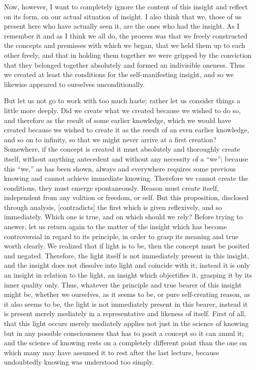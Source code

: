 Now, however, I want to completely ignore the content of
this insight and reflect on its form, on our actual situation of insight.
I also think that we, those of us present here who have actually seen it,
are the ones who had the insight.
As I remember it and as I think we all do, the
process was that we freely constructed the concepts and premisses with
which we began, that we held them up to each other freely, and that in
holding them together we were gripped by the conviction that they
belonged together absolutely and formed an indivisible oneness.
Thus we created at least the conditions for the self-manifesting insight,
and so we likewise appeared to ourselves unconditionally.

But let us not go to work with too much haste;
rather let us consider things a little more deeply.
Did we create what we created because we wished to do so, and
therefore as the result of some earlier knowledge,
which we would have created because we wished to create it
as the result of an even earlier knowledge, and so on to infinity,
so that we might never arrive at a first creation?
Somewhere, if the concept is created it must absolutely and thoroughly
create itself, without anything antecedent and
without any necessity of a “we”;
because this “we,” as has been shown,
always and everywhere requires some previous knowing and
cannot achieve immediate knowing.
Therefore we cannot create the conditions,
they must emerge spontaneously.
Reason must create itself,
independent from any volition or freedom, or self.
But this proposition, disclosed through analysis,
[contradicts] the first which is given reflexively,
and so immediately.
Which one is true, and on which should we rely?
Before trying to answer, let us return again to the matter of the insight
which has become controversial in regard to its principle,
in order to grasp its meaning and true worth clearly.
We realized that if light is to be,
then the concept must be posited and negated.
Therefore, the light itself is not immediately present in this insight,
and the insight does not dissolve into light and coincide with it;
instead it is only an insight in relation to the light,
an insight which objectifies it,
grasping it by its inner quality only.
Thus, whatever the principle and true bearer of this insight might be,
whether we ourselves, as it seems to be,
or pure self-creating reason, as it also seems to be,
the light is not immediately present in this bearer,
instead it is present merely mediately in
a representative and likeness of itself.
First of all, that this light occurs merely mediately applies not
just in the science of knowing but in any possible consciousness
that has to posit a concept so it can annul it;
and the science of knowing rests on a completely different point
than the one on which many may have assumed it to rest after the last lecture,
because undoubtedly knowing was understood too simply.

